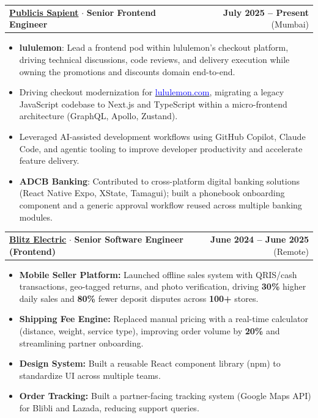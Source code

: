 \documentclass[a4paper,11pt]{article}
\makeatletter
\newcommand{\resumeExp}[4]{
\vspace{0mm}\item[]
    \begin{tabular*}{\textwidth}[t]{l@{\extracolsep{\fill}}r}
        \hspace{-4.4mm} \small\textbf{\textcolor{blue}{#1}} $\cdot$ \small{\textbf{#2}} & {\footnotesize{#3}} {\footnotesize{(#4)}}
    \end{tabular*}
    \vspace{-7mm}
}
\newcommand{\resumeItemListStart}{\begin{justify}\begin{itemize}[leftmargin=3ex, rightmargin=2ex, noitemsep,labelsep=1.2mm,itemsep=0mm]\small}
\newcommand{\resumeItemListEnd}{\end{itemize}\end{justify}\vspace{-1.5mm}}
\makeatother
\begin{document}
\resumeExp
{\href{https://www.publicissapient.com/}{Publicis Sapient}}
{Senior Frontend Engineer}
{\textbf{July 2025 – Present}}
{Mumbai}
\resumeItemListStart
\item[$\cdot$] \textbf{lululemon}: Lead a frontend pod within lululemon's checkout platform, driving technical discussions, code reviews, and delivery execution while owning the promotions and discounts domain end-to-end.
\item[$\cdot$] Driving checkout modernization for \href{https://shop.lululemon.com/}{\textcolor{blue}{lululemon.com}}, migrating a legacy JavaScript codebase to Next.js and TypeScript within a micro-frontend architecture (GraphQL, Apollo, Zustand).
\item[$\cdot$] Leveraged AI-assisted development workflows using GitHub Copilot, Claude Code, and agentic tooling to improve developer productivity and accelerate feature delivery.
\item[$\cdot$] \textbf{ADCB Banking}: Contributed to cross-platform digital banking solutions (React Native Expo, XState, Tamagui); built a phonebook onboarding component and a generic approval workflow reused across multiple banking modules.
\resumeItemListEnd

\vspace{2mm}
\resumeExp
{\href{https://www.blitzelectric.id/}{Blitz Electric}}
{Senior Software Engineer (Frontend)}
{\textbf{June 2024 – June 2025}}
{Remote}
\resumeItemListStart
\item[$\cdot$] \textbf{Mobile Seller Platform:} Launched offline sales system with QRIS/cash transactions, geo-tagged returns, and photo verification, driving \textbf{30\%} higher daily sales and \textbf{80\%} fewer deposit disputes across \textbf{100+} stores.
\item[$\cdot$] \textbf{Shipping Fee Engine:} Replaced manual pricing with a real-time calculator (distance, weight, service type), improving order volume by \textbf{20\%} and streamlining partner onboarding.
\item[$\cdot$] \textbf{Design System:} Built a reusable React component library (npm) to standardize UI across multiple teams.
\item[$\cdot$] \textbf{Order Tracking:} Built a partner-facing tracking system (Google Maps API) for Blibli and Lazada, reducing support queries.
\resumeItemListEnd
\end{document}

